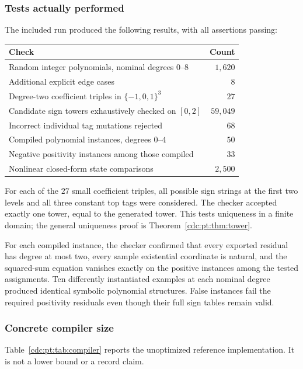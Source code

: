 \documentclass[11pt,a4paper]{article}
\theoremstyle{definition}
\theoremstyle{remark}
\begin{document}
\subsubsection{Tests actually performed}
The included run produced the following results, with all assertions
passing:
\begin{center}
\begin{tabular}{lr}
\toprule
Check & Count\\
\midrule
Random integer polynomials, nominal degrees $0$--$8$ & $1{,}620$\\
Additional explicit edge cases & $8$\\
Degree-two coefficient triples in $\{-1,0,1\}^3$ & $27$\\
Candidate sign towers exhaustively checked on $[0,2]$ & $59{,}049$\\
Incorrect individual tag mutations rejected & $68$\\
Compiled polynomial instances, degrees $0$--$4$ & $50$\\
Negative positivity instances among those compiled & $33$\\
Nonlinear closed-form state comparisons & $2{,}500$\\
\bottomrule
\end{tabular}
\end{center}
For each of the $27$ small coefficient triples, all possible sign strings
at the first two levels and all three constant top tags were considered.
The checker accepted exactly one tower, equal to the generated tower.
This tests uniqueness in a finite domain; the general uniqueness proof is
Theorem~\ref{cdc:pt:thm:tower}.

For each compiled instance, the checker confirmed that every exported
residual has degree at most two, every sample existential coordinate is
natural, and the squared-sum equation vanishes exactly on the positive
instances among the tested assignments. Ten differently instantiated
examples at each nominal degree produced identical symbolic polynomial
structures. False instances fail the required positivity residuals even
though their full sign tables remain valid.

\subsubsection{Concrete compiler size}
Table~\ref{cdc:pt:tab:compiler} reports the unoptimized reference implementation.
It is not a lower bound or a record claim.
\end{document}

